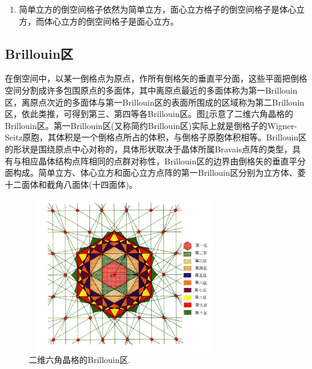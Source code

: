 \begin{enumerate}
\item 简单立方的倒空间格子依然为简单立方，面心立方格子的倒空间格子是体心立方，而体心立方的倒空间格子是面心立方。
\end{enumerate}

\subsection{Brillouin区} 
在倒空间中，以某一倒格点为原点，作所有倒格矢的垂直平分面，这些平面把倒格空间分割成许多包围原点的多面体，其中离原点最近的多面体称为第一Brillouin区，离原点次近的多面体与第一Brillouin区的表面所围成的区域称为第二Brillouin区，依此类推，可得到第三、第四等各Brillouin区。图\ref{Fig:Brillouin-2D}示意了二维六角晶格的Brillouin区。第一Brillouin区(又称简约Brillouin区)实际上就是倒格子的Wigner-Seitz原胞，其体积是一个倒格点所占的体积，与倒格子原胞体积相等。Brillouin区的形状是围绕原点中心对称的，具体形状取决于晶体所属Bravais点阵的类型，具有与相应晶体结构点阵相同的点群对称性，Brillouin区的边界由倒格矢的垂直平分面构成。简单立方、体心立方和面心立方点阵的第一Brillouin区分别为立方体、菱十二面体和截角八面体(十四面体)。
\begin{figure}[h!]
\centering
\vspace*{-0.05in}
\includegraphics[height=2.65in,width=3.35in,viewport=0 0 510 440,clip]{Figures/2D-Brillouin-Zone.jpg}
\caption{\small \textrm{二维六角晶格的Brillouin区.}}%
\label{Fig:Brillouin-2D}
\end{figure}

